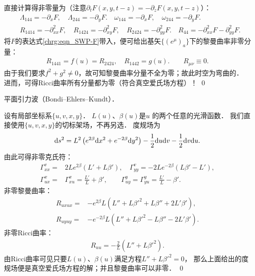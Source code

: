 直接计算得非零量为（注意$\partial_t F(x,y,t-z)=-\partial_z F(x,y,t-z)$）：
\begin{align*}
&\Lambda_{144} = -\partial_x F,\quad
\Lambda_{244} = -\partial_y F.\quad
\omega_{144} = -\partial_x F,\quad
\omega_{244} = -\partial_y F. \\
&R_{1414} = -\partial^{2}_{xx} F,\quad
R_{1424} = -\partial^2_{xy}F,\quad 
R_{2424} = -\partial^2_{yy}F. \quad
R_{44} = -\partial^2_{xx}F -\partial^2_{yy}F .
\end{align*}
将$F$的表达式\eqref{chrg:eqn_SWP-F}带入，便可给出基矢$\{(e^\mu)_a\}$下的黎曼曲率非零分量：
\begin{align*}
	R_{1441}= f(u) = R_{2424},\quad R_{1442} = g(u) .
	\qquad R_{\mu\nu}\equiv 0 .
\end{align*}
由于我们要求$f^2+g^2 \neq 0$，故可知黎曼曲率分量不全为零；故此时空为弯曲的．
进而，可得Ricci曲率所有分量都为零（符合真空爱氏场方程）！
\qed

\begin{example}\label{chrg:exm_BondiPlane}
	平面引力波（Bondi--Ehlers--Kundt）．
\end{example}

设有局部坐标系$\{u,v, x, y\}$．
$L(u)$、$\beta(u)$是$u$ 的两个任意的光滑函数．
我们直接使用$\{u, v, x, y\}$的切标架场，不再另选．
度规场为
\begin{equation*}
	{\rm d}s^2 = L^2\left( e^{2\beta}{\rm d}x^2 +e^{-2\beta}{\rm d}y^2 \right) 
	- \frac{1}{2}{\rm d}u{\rm d}v - \frac{1}{2}{\rm d}v{\rm d}u.
\end{equation*}
由此可得非零克氏符：
\begin{align*}
	\Gamma^v_{xx} =& 2 L e^{2 \beta } \left(L'+L \beta'\right),\quad
	\Gamma^v_{yy} = -2 L e^{-2\beta } \left(L\beta'-L'\right) ,\\
	\Gamma^x_{ux} =& \Gamma^x_{xu} =  \frac{L'}{L}+\beta', \qquad
	\Gamma^y_{uy} =  \Gamma^y_{yu} = \frac{L'}{L}-\beta' .
\end{align*}
非零黎曼曲率：
\begin{align*}
	R_{uxux} =& -e^{ 2 \beta} L \left(L''+ L\beta'^2 + L\beta'' +2 L' \beta'\right),\\
	R_{uyuy} =& -e^{-2 \beta} L \left(L''+ L\beta'^2 - L \beta''-2 L' \beta'\right).
\end{align*}
非零Ricci曲率：
\begin{align*}
	R_{uu} = -\frac{2}{L} \left(L''+L \beta'^2\right) .
\end{align*}
由Ricci曲率可见只要$L(u)$、$\beta(u)$满足方程$L''+L\beta'^2=0$，
那么上面给出的度规场便是真空爱氏场方程的解；并且黎曼曲率可以非零．
\qed

